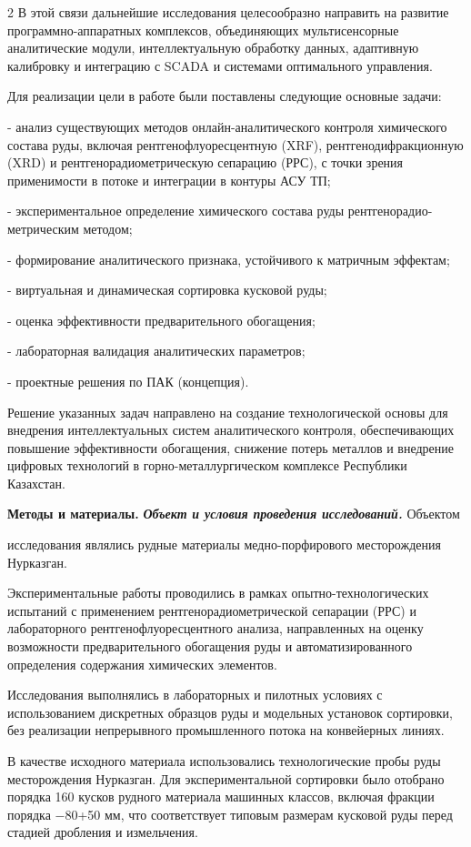 \begin{multicols}{2}
В этой связи дальнейшие исследования целесообразно направить на развитие
программно-аппаратных комплексов, объединяющих мультисенсорные
аналитические модули, интеллектуальную обработку данных, адаптивную
калибровку и интеграцию с SCADA и системами оптимального управления.

Для реализации цели в работе были поставлены следующие основные задачи:

- анализ существующих методов онлайн-аналитического контроля химического
состава руды, включая рентгенофлуоресцентную (XRF),
рентгенодифракционную (XRD) и рентгенорадиометрическую сепарацию (РРС),
с точки зрения применимости в потоке и интеграции в контуры АСУ ТП;

- экспериментальное определение химического состава руды
рентгенорадио-метрическим методом;

- формирование аналитического признака, устойчивого к матричным
эффектам;

- виртуальная и динамическая сортировка кусковой руды;

- оценка эффективности предварительного обогащения;

- лабораторная валидация аналитических параметров;

- проектные решения по ПАК (концепция).

Решение указанных задач направлено на создание технологической основы
для внедрения интеллектуальных систем аналитического контроля,
обеспечивающих повышение эффективности обогащения, снижение потерь
металлов и внедрение цифровых технологий в горно-металлургическом
комплексе Республики Казахстан.

{\bfseries Методы и материалы.} \emph{{\bfseries Объект и условия проведения
исследований.}} Объектом

исследования являлись рудные материалы медно-порфирового месторождения
Нурказган.

Экспериментальные работы проводились в рамках опытно-технологических
испытаний с применением рентгенорадиометрической сепарации (РРС) и
лабораторного рентгенофлуоресцентного анализа, направленных на оценку
возможности предварительного обогащения руды и автоматизированного
определения содержания химических элементов.

Исследования выполнялись в лабораторных и пилотных условиях с
использованием дискретных образцов руды и модельных установок
сортировки, без реализации непрерывного промышленного потока на
конвейерных линиях.

В качестве исходного материала использовались технологические пробы руды
месторождения Нурказган. Для экспериментальной сортировки было отобрано
порядка 160 кусков рудного материала машинных классов, включая фракции
порядка −80+50 мм, что соответствует типовым размерам кусковой руды
перед стадией дробления и измельчения.


\end{multicols}
